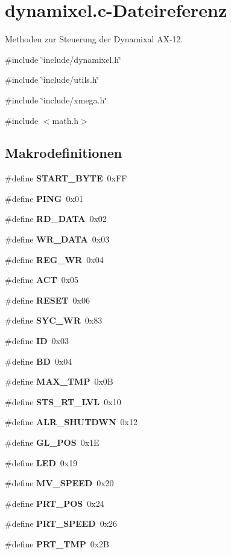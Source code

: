 \section{dynamixel.c-\/Dateireferenz}
\label{dynamixel_8c}


Methoden zur Steuerung der Dynamixal AX-\/12.  


{\ttfamily \#include \char`\"{}include/dynamixel.h\char`\"{}}\par
{\ttfamily \#include \char`\"{}include/utils.h\char`\"{}}\par
{\ttfamily \#include \char`\"{}include/xmega.h\char`\"{}}\par
{\ttfamily \#include $<$math.h$>$}\par
\subsection*{Makrodefinitionen}
\begin{DoxyCompactItemize}
\item 
\#define {\bf START\_\-BYTE}~0xFF
\item 
\#define {\bf PING}~0x01
\item 
\#define {\bf RD\_\-DATA}~0x02
\item 
\#define {\bf WR\_\-DATA}~0x03
\item 
\#define {\bf REG\_\-WR}~0x04
\item 
\#define {\bf ACT}~0x05
\item 
\#define {\bf RESET}~0x06
\item 
\#define {\bf SYC\_\-WR}~0x83
\item 
\#define {\bf ID}~0x03
\item 
\#define {\bf BD}~0x04
\item 
\#define {\bf MAX\_\-TMP}~0x0B
\item 
\#define {\bf STS\_\-RT\_\-LVL}~0x10
\item 
\#define {\bf ALR\_\-SHUTDWN}~0x12
\item 
\#define {\bf GL\_\-POS}~0x1E
\item 
\#define {\bf LED}~0x19
\item 
\#define {\bf MV\_\-SPEED}~0x20
\item 
\#define {\bf PRT\_\-POS}~0x24
\item 
\#define {\bf PRT\_\-SPEED}~0x26
\item 
\#define {\bf PRT\_\-TMP}~0x2B
\end{DoxyCompactItemize}
